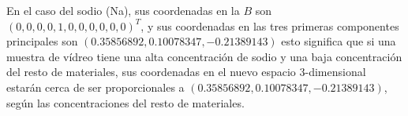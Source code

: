 \documentclass[12pt]{article}
\begin{document}
En el caso del sodio (Na), sus coordenadas en la $B$ son
$(0,0,0,0,1,0,0,0,0,0,0)^T$, y sus coordenadas en las tres primeras
componentes principales son $(0.35856892,0.10078347,-0.21389143)$ esto
significa que si una muestra de vídreo tiene una alta concentración de
sodio y una baja concentración del resto de materiales, sus
coordenadas en el nuevo espacio 3-dimensional estarán cerca de ser
proporcionales a $(0.35856892,0.10078347,-0.21389143)$, según las
concentraciones del resto de materiales.
\end{document}
